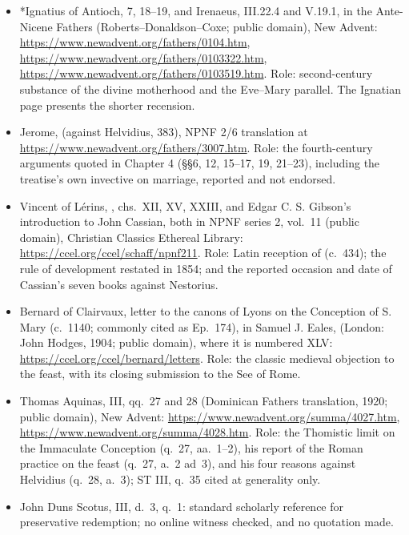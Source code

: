 \begin{itemize}
\item *Ignatius of Antioch,  7, 18--19,
and Irenaeus,  III.22.4 and V.19.1, in the
Ante-Nicene Fathers (Roberts--Donaldson--Coxe; public domain), New
Advent: \url{https://www.newadvent.org/fathers/0104.htm},
\url{https://www.newadvent.org/fathers/0103322.htm},
\url{https://www.newadvent.org/fathers/0103519.htm}. Role: second-century
substance of the divine motherhood and the Eve--Mary parallel. The
Ignatian page presents the shorter recension.
\item Jerome,  (against
Helvidius, 383), NPNF 2/6 translation at
\url{https://www.newadvent.org/fathers/3007.htm}. Role: the
fourth-century arguments quoted in Chapter 4 (\S\S6, 12, 15--17, 19,
21--23), including the treatise's own invective on marriage, reported and
not endorsed.
\item Vincent of L\'erins, , chs.~XII, XV, XXIII, and
Edgar C. S. Gibson's introduction to John Cassian, both in NPNF series
2, vol.~11 (public domain), Christian Classics Ethereal Library:
\url{https://ccel.org/ccel/schaff/npnf211}. Role: Latin reception of
 (c.~434); the rule of development restated in 1854; and
the reported occasion and date of Cassian's seven books against
Nestorius.
\item Bernard of Clairvaux, letter to the canons of Lyons on the
Conception of S. Mary (c.~1140; commonly cited as Ep.~174), in Samuel J.
Eales,  (London:
John Hodges, 1904; public domain), where it is numbered XLV:
\url{https://ccel.org/ccel/bernard/letters}. Role: the classic medieval
objection to the feast, with its closing submission to the See of Rome.
\item Thomas Aquinas,  III, qq.~27 and 28
(Dominican Fathers translation, 1920; public domain), New Advent:
\url{https://www.newadvent.org/summa/4027.htm},
\url{https://www.newadvent.org/summa/4028.htm}. Role: the Thomistic limit
on the Immaculate Conception (q.~27, aa.~1--2), his report of the Roman
practice on the feast (q.~27, a.~2 ad~3), and his four reasons against
Helvidius (q.~28, a.~3); ST III, q.~35 cited at generality only.
\item John Duns Scotus,  III, d.~3, q.~1: standard
scholarly reference for preservative redemption; no online witness
checked, and no quotation made.
\end{itemize}


